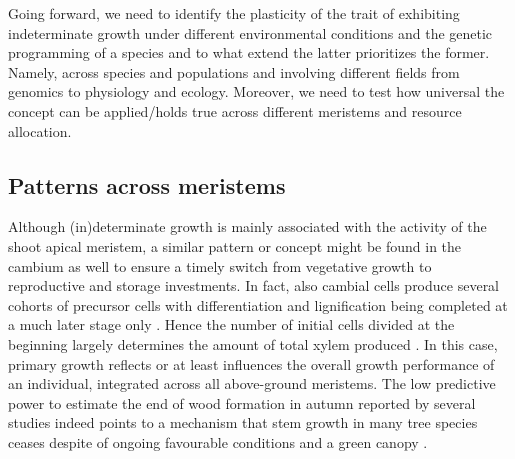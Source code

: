 \documentclass{article}
\begin{document}
Going forward, we need to identify the plasticity of the trait of exhibiting indeterminate growth under different environmental conditions and the genetic programming of a species and to what extend the latter prioritizes the former. Namely, across species and populations and involving different fields from genomics to physiology and ecology. Moreover, we need to test how universal the concept can be applied/holds true across different meristems and resource allocation. %

\subsection*{Patterns across meristems} %
Although (in)determinate growth is mainly associated with the activity of the shoot apical meristem, a similar pattern or concept might be found in the cambium as well to ensure a timely switch from vegetative growth to reproductive and storage investments. In fact, also cambial cells produce several cohorts of precursor cells with differentiation and lignification being completed at a much later stage only \citep{valdovinos-ayalaSeasonalPatternsIncreases2022}. Hence the number of initial cells divided at the beginning largely determines the amount of total xylem produced \cite{lupiXylemPhenologyWood2010}. In this case, primary growth reflects or at least influences the overall growth performance of an individual, integrated across all above-ground meristems. The low predictive power to estimate the end of wood formation in autumn reported by several studies \cite{buttoComparingCellDynamics2020} indeed points to a mechanism that stem growth in many tree species ceases despite of ongoing favourable conditions and a  green canopy \cite{arendStemGrowthPhenology2024}.\\
\end{document}
